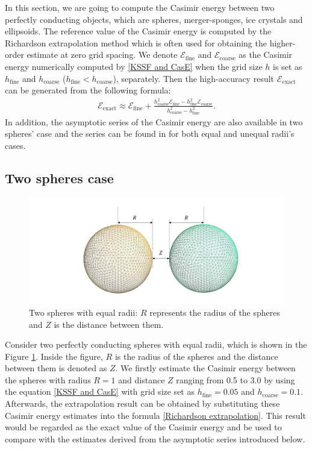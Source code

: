 In this section, we are going to compute the Casimir energy between two perfectly conducting objects, which are spheres, merger-sponges, ice crystals and 
ellipsoids. The reference value of the Casimir energy is computed by the Richardson extrapolation method which is often used 
for obtaining the higher-order estimate at zero grid spacing. We denote $\mathcal{E}_{\text{fine}}$ and $\mathcal{E}_{\text{coarse}}$ as the Casimir energy 
numerically computed by \eqref{KSSF and CasE} when the grid size $h$ is set as $h_{\text{fine}}$ and $h_{\text{coarse}}$ ($h_{\text{fine}}<h_{\text{coarse}}$), separately. Then the high-accuracy 
result $\mathcal{E}_{\text{exact}}$ can be generated from the following formula:
\begin{align}\label{Richardson extrapolation}
    \mathcal{E}_{\text{exact}} \approx \mathcal{E}_{\text{fine}} + \frac{h_{\text{coarse}}^{2}\mathcal{E}_{\text{fine}} - h_{\text{fine}}^{2}\mathcal{E}_{\text{coarse}}}{h_{\text{coarse}}^{2} - h_{\text{fine}}^{2}}.
\end{align}
In addition, the asymptotic series of the Casimir energy are also available in two spheres' case and the series can be found in \cite{emig2008casimir} 
for both equal and unequal radii's cases. 

\subsection{Two spheres case}
\begin{figure}[H]
    \includegraphics[scale = 0.6]{figures/Grid_two_spheres_dist.png}
    \caption{Two spheres with equal radii: $R$ represents the radius of the spheres and $Z$ is the distance between them.}
    \label{Two spheres with equal radii}
\end{figure}

Consider two perfectly conducting spheres with equal radii, which is shown in the Figure \ref{Two spheres with equal radii}. Inside the figure, $R$ is the radius 
of the spheres and the distance between them is denoted as $Z$. We firstly estimate the Casimir energy between the spheres with radius $R = 1$ and distance $Z$ 
ranging from 0.5 to 3.0 by using the equation \eqref{KSSF and CasE} with grid size set as $h_{\text{fine}} = 0.05$ and $h_{\text{coarse}} = 0.1$. Afterwards,
the extrapolation result can be obtained by substituting these Casimir energy estimates into the formula \eqref{Richardson extrapolation}. This result would be 
regarded as the exact value of the Casimir energy and be used to compare with the estimates derived from the asymptotic series introduced below. 

